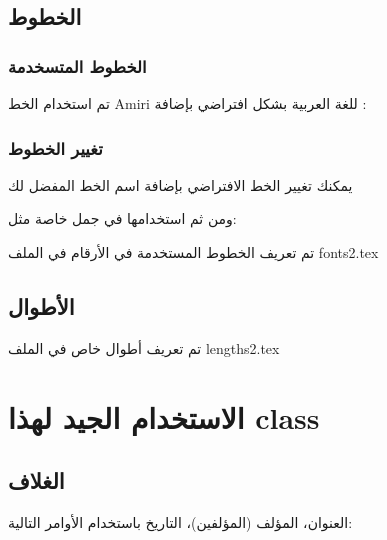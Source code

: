 \documentclass[12pt,a4paper]{mathbook_arabic}
\newcommand\ee{\textenglish}
\begin{document}
\section{الخطوط}




\subsection{الخطوط المتسخدمة}
تم استخدام الخط Amiri
للغة العربية بشكل افتراضي 
بإضافة :




\vspace*{2cm}
\subsection{تغيير الخطوط}
يمكنك تغيير الخط الافتراضي بإضافة اسم الخط المفضل لك 




ومن ثم استخدامها في جمل خاصة مثل:

 تم تعريف    الخطوط المستخدمة في الأرقام  في  الملف
\ee{fonts\textunderscore2.tex}






\section{الأطوال}
تم تعريف أطوال خاص في الملف
\ee{lengths\textunderscore2.tex}
 
\chapter{الاستخدام الجيد لهذا class}
 




\section{الغلاف}
العنوان، المؤلف (المؤلفين)، التاريخ باستخدام الأوامر التالية:
 
\end{document}

